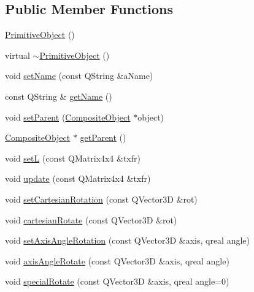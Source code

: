 \subsection*{Public Member Functions}
\begin{DoxyCompactItemize}
\item 
\hyperlink{class_robot_model_1_1_primitive_object_ad8db4622c9ec75d92c70f4fba00863bf}{PrimitiveObject} ()
\item 
virtual \hyperlink{class_robot_model_1_1_primitive_object_a30e56bb8d777bf91ec7627fdfa0073b2}{$\sim$PrimitiveObject} ()
\item 
void \hyperlink{class_robot_model_1_1_primitive_object_a61c7cffdac933e1f363fa7d4715f669c}{setName} (const QString \&aName)
\item 
const QString \& \hyperlink{class_robot_model_1_1_primitive_object_a2bad14bd18e70f3e95b6ebfca7014d2e}{getName} ()
\item 
void \hyperlink{class_robot_model_1_1_primitive_object_afdcf8007d5aebfa88356d5551afb9775}{setParent} (\hyperlink{class_robot_model_1_1_composite_object}{CompositeObject} $\ast$object)
\item 
\hyperlink{class_robot_model_1_1_composite_object}{CompositeObject} $\ast$ \hyperlink{class_robot_model_1_1_primitive_object_a6981588496b77d1942435296631d1ef0}{getParent} ()
\item 
void \hyperlink{class_robot_model_1_1_primitive_object_a2d5bb08b04bf39964106c981cdca7d0e}{setL} (const QMatrix4x4 \&txfr)
\item 
void \hyperlink{class_robot_model_1_1_primitive_object_ac87b33448b7e82dddbca79f57ea8cbb5}{update} (const QMatrix4x4 \&txfr)
\item 
void \hyperlink{class_robot_model_1_1_primitive_object_a0a7cfefb126e4f37c208c516f8ffd9bb}{setCartesianRotation} (const QVector3D \&rot)
\item 
void \hyperlink{class_robot_model_1_1_primitive_object_a69c30287deb6549fbde68d1ba37424a8}{cartesianRotate} (const QVector3D \&rot)
\item 
void \hyperlink{class_robot_model_1_1_primitive_object_a3ae3782ae64f5fc07f4d18646e04ed21}{setAxisAngleRotation} (const QVector3D \&axis, qreal angle)
\item 
void \hyperlink{class_robot_model_1_1_primitive_object_a97b449302680b96410ff7296c794f640}{axisAngleRotate} (const QVector3D \&axis, qreal angle)
\item 
void \hyperlink{class_robot_model_1_1_primitive_object_a07ece283ed8f0f0e3cdf6f36ac7b34dd}{specialRotate} (const QVector3D \&axis, qreal angle=0)

\end{DoxyCompactItemize}
